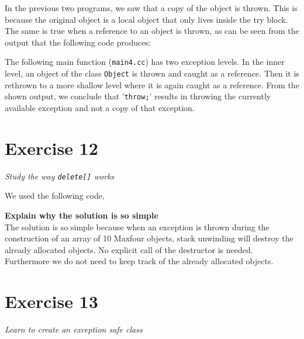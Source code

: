 \documentclass[12pt]{article}
\newcommand{\desc}[1]{\textit{#1} \vspace{1em}}
\begin{document}
\vspace{0.5cm}
In the previous two programs, we saw that a copy of the object is thrown. This is because the original object is a local object that only lives inside the try block. The same is true when a reference to an object is thrown, as can be seen from the output that the following code produces:



\vspace{0.5cm}
The following main function (\texttt{main4.cc}) has two exception levels. In the inner level, an object of the class \texttt{Object} is thrown and caught as a reference. Then it is rethrown to a more shallow level where it is again caught as a reference. From the shown output, we conclude that '\texttt{throw;}' results in throwing the currently available exception and not a copy of that exception.




\clearpage
\section*{Exercise 12}
\desc{Study the way \texttt{delete[]} works}

We used the following code,









\textbf{Explain why the solution is so simple}\\
The solution is so simple because when an exception is thrown during the construction of an array of 10 Maxfour objects, stack unwinding will destroy the already allocated objects. No explicit call of the destructor is needed. Furthermore we do not need to keep track of the already allocated objects. 

\clearpage
\section*{Exercise 13}
\desc{Learn to create an exception safe class}
\end{document}
